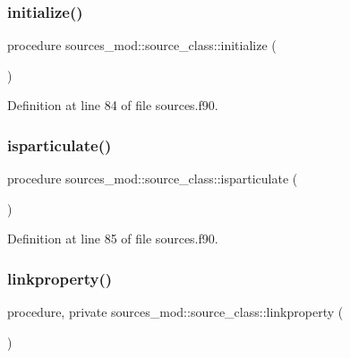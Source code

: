 \subsubsection{\texorpdfstring{initialize()}{initialize()}}
{\footnotesize\ttfamily procedure sources\+\_\+mod\+::source\+\_\+class\+::initialize (\begin{DoxyParamCaption}{ }\end{DoxyParamCaption})\hspace{0.3cm}{\ttfamily [private]}}



Definition at line 84 of file sources.\+f90.

\mbox{\label{structsources__mod_1_1source__class_aa0577157bf75a525f9e1bde905500ab7}} 
\subsubsection{\texorpdfstring{isparticulate()}{isparticulate()}}
{\footnotesize\ttfamily procedure sources\+\_\+mod\+::source\+\_\+class\+::isparticulate (\begin{DoxyParamCaption}{ }\end{DoxyParamCaption})\hspace{0.3cm}{\ttfamily [private]}}



Definition at line 85 of file sources.\+f90.

\mbox{\label{structsources__mod_1_1source__class_a58282637980cd13f683be32cb57dc227}} 
\subsubsection{\texorpdfstring{linkproperty()}{linkproperty()}}
{\footnotesize\ttfamily procedure, private sources\+\_\+mod\+::source\+\_\+class\+::linkproperty (\begin{DoxyParamCaption}{ }\end{DoxyParamCaption})\hspace{0.3cm}{\ttfamily [private]}}



